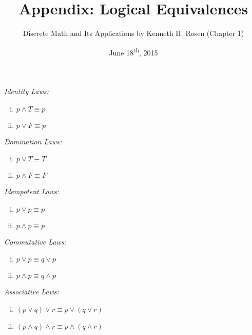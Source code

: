 \documentclass[a4paper,8pt]{article}
\title{Appendix: Logical Equivalences}
\author{Discrete Math and Its Applications by Kenneth H. Rosen (Chapter 1)}
\date{June 18\textsuperscript{th}, 2015}
\begin{document}
\maketitle
{}

\begin{outline}

    \begin{enumerate}
      \begin{minipage}[t]{.5\textwidth}
        \item \textit{Identity Laws:}
          \begin{enumerate}[i.]
            \item \(p \wedge T \equiv p\)
            \item \(p \vee F \equiv p\)
          \end{enumerate}
        \item \textit{Domination Laws:}
          \begin{enumerate}[i.]
            \item \(p \vee T \equiv T\)
            \item \(p \wedge F \equiv F\)
          \end{enumerate}
        \item \textit{Idempotent Laws:}
          \begin{enumerate}[i.]
            \item \(p \vee p \equiv p\)
            \item \(p \wedge p \equiv p\)
          \end{enumerate}
        \item \textit{Commutative Laws:}
          \begin{enumerate}[i.]
            \item \(p \vee p \equiv q \vee p\)
            \item \(p \wedge p \equiv q \wedge p\)
          \end{enumerate}
        \item \textit{Associative Laws:}
          \begin{enumerate}[i.]
            \item \((p \vee q) \vee r \equiv p \vee (q \vee r)\)
            \item \((p \wedge q) \wedge r \equiv p \wedge (q \wedge r)\)
          \end{enumerate}
      \end{minipage}%
      \begin{minipage}[t]{.5\textwidth}

\end{minipage}
\end{enumerate}
\end{outline}
\end{document}
